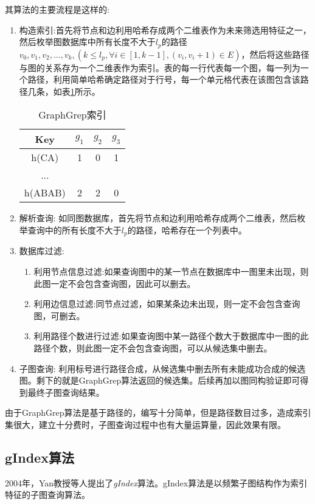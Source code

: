 \documentclass{XDBAthesis}
\begin{document}
其算法的主要流程是这样的:
\begin{enumerate}
    \item 构造索引:首先将节点和边利用哈希存成两个二维表作为未来筛选用特征之一，然后枚举图数据库中所有长度不大于$l_p $的路径$v_0 ,v_1 ,v_2 ,...,v_k ,( k\leq l_p ,\forall i\in [1,k-1],(v_i ,v_i+1)\in E) $，然后将这些路径与图的关系存为一个二维表作为索引。表的每一行代表每一个图，每一列为一个路径，利用简单哈希确定路径对于行号，每一个单元格代表在该图包含该路径几条，如表\ref{tb:grepIndex}所示。

\begin{table}[htb]
    \centering
    \begin{tabular}{|c|c|c|c|}
        \hline
        Key&$g_1 $&$g_2 $&$g_3 $ \\ \hline
        h(CA)&1&0&1 \\ \hline
        ...&&&\\ \hline
        h(ABAB)&2&2&0 \\
        \hline
    \end{tabular}
    \caption{GraphGrep索引}
    \label{tb:grepIndex}
\end{table}

    \item 解析查询: 如同图数据库，首先将节点和边利用哈希存成两个二维表，然后枚举查询中的所有长度不大于$l_p $的路径，哈希存在一个列表中。
    \item 数据库过滤: 
        \begin{enumerate}
            \item 利用节点信息过滤:如果查询图中的某一节点在数据库中一图里未出现，则此图一定不会包含查询图，因此可以删去。
            \item 利用边信息过滤:同节点过滤，如果某条边未出现，则一定不会包含查询图，可删去。
            \item 利用路径个数进行过滤:如果查询图中某一路径个数大于数据库中一图的此路径个数，则此图一定不会包含查询图，可以从候选集中删去。
        \end{enumerate}
    \item 子图查询: 利用标号进行路径合成，从候选集中删去所有未能成功合成的候选图。剩下的就是GraphGrep算法返回的候选集。后续再加以图同构验证即可得到最终子图查询结果。
    
\end{enumerate}

由于GraphGrep算法是基于路径的，编写十分简单，但是路径数目过多，造成索引集很大，建立十分费时，子图查询过程中也有大量运算量，因此效果有限。


\subsection{gIndex算法}
2004年，Yan教授等人提出了\emph{gIndex}算法\cite{gIndex}。gIndex算法是以频繁子图结构作为索引特征的子图查询算法。


\ifx\allfiles\undefined


\end{document}
